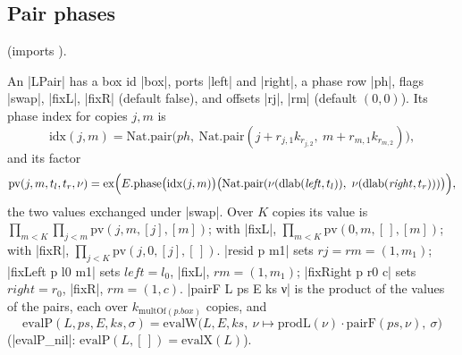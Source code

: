 \subsection{Pair phases}

 (imports ).

\begin{definition}\label{def:lean-sym-lpair}
An \lean|LPair| has a box id \lean|box|, ports \lean|left| and \lean|right|, a phase row \lean|ph|, flags \lean|swap|, \lean|fixL|, \lean|fixR| (default false), and offsets \lean|rj|, \lean|rm| (default $(0,0)$). Its phase index for copies $j,m$ is
\[
\mathrm{idx}(j,m)=\mathrm{Nat.pair}\bigl(\mathit{ph},\ \mathrm{Nat.pair}(j+r_{j,1}k_{r_{j,2}},\ m+r_{m,1}k_{r_{m,2}})\bigr),
\]
and its factor
\[
\mathrm{pv}(j,m,t_l,t_r,\nu)=\mathrm{ex}\Bigl(E.\mathrm{phase}\bigl(\mathrm{idx}(j,m)\bigr)\bigl(\mathrm{Nat.pair}(\nu(\mathrm{dlab}(\mathit{left},t_l)),\ \nu(\mathrm{dlab}(\mathit{right},t_r)))\bigr)\Bigr),
\]
the two values exchanged under \lean|swap|. Over $K$ copies its value is $\prod_{m<K}\prod_{j<m}\mathrm{pv}(j,m,[j],[m])$; with \lean|fixL|, $\prod_{m<K}\mathrm{pv}(0,m,[\,],[m])$; with \lean|fixR|, $\prod_{j<K}\mathrm{pv}(j,0,[j],[\,])$. \lean|resid p m1| sets $\mathit{rj}=\mathit{rm}=(1,m_1)$; \lean|fixLeft p l0 m1| sets $\mathit{left}=l_0$, \lean|fixL|, $\mathit{rm}=(1,m_1)$; \lean|fixRight p r0 c| sets $\mathit{right}=r_0$, \lean|fixR|, $\mathit{rm}=(1,c)$. \lean|pairF L ps E ks ν| is the product of the values of the pairs, each over $k_{\mathrm{multOf}(p.\mathit{box})}$ copies, and
\[
\mathrm{evalP}(L,ps,E,ks,\sigma)=\mathrm{evalW}\bigl(L,E,ks,\ \nu\mapsto\mathrm{prodL}(\nu)\cdot\mathrm{pairF}(ps,\nu),\ \sigma\bigr)
\]
(\lean|evalP_nil|: $\mathrm{evalP}(L,[\,])=\mathrm{evalX}(L)$).
\end{definition}


